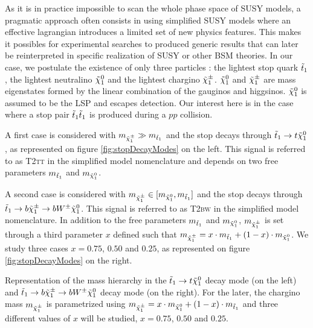         As it is in practice impossible to scan the whole phase space of SUSY models, a
        pragmatic approach often consists in using simplified SUSY models where an
        effective lagrangian introduces a limited set of new physics features. This makes
        it possibles for experimental searches to produced generic results that can later
        be reinterpreted in specific realization of SUSY \cite{LiemSMS, SmodelS}
        or other BSM theories. In our case, we postulate the existence of only three
        particles : the lightest stop quark $\tilde{t}_1$, the lightest neutralino $\tilde{\chi}_1^0$
        and the lightest chargino $\tilde{\chi}_1^\pm$. $\tilde{\chi}_1^0$ and $\tilde{\chi}_1^\pm$ are mass
        eigenstates formed by the linear combination of the gauginos and  higgsinos.
        $\tilde{\chi}_1^0$ is assumed to be the LSP and escapes detection. Our interest here
        is in the case where a stop pair $\tilde{t}_1\tilde{t}_1$ is produced during a $pp$ collision.

        A first case is considered with $m_{\tilde{\chi}_1^\pm} \gg m_{\tilde{t}_1}$ and the stop
        decays through $\tilde{t}_1 \rightarrow t \tilde{\chi}_1^0$, as represented on figure
        \ref{fig:stopDecayModes} on the left. This signal is referred to as \textsc{T2tt}
        in the simplified model nomenclature and depends on two free parameters
        $m_{\tilde{t}_1}$ and $m_{\tilde{\chi}_1^0}$.

        A second case is considered with $m_{\tilde{\chi}_1^\pm} \in [m_{\tilde{\chi}_1^0},
        m_{\tilde{t}_1}]$ and the stop decays through $\tilde{t}_1 \rightarrow b \tilde{\chi}_1^\pm
        \rightarrow b W^{\pm} \tilde{\chi}_1^0$. This signal is referred to as \textsc{T2bw}
        in the simplified model nomenclature. In addition to the free  parameters
        $m_{\tilde{t}_1}$ and $m_{\tilde{\chi}_1^0}$, $m_{\tilde{\chi}_1^\pm}$ is set through a
        third parameter $x$ defined such that $m_{\tilde{\chi}_1^\pm} = x \cdot m_{\tilde{t}_1}
        + (1 - x) \cdot m_{\tilde{\chi}_1^0}$. We study three cases $x = 0.75$, $0.50$
        and $0.25$, as represented on figure \ref{fig:stopDecayModes} on the right.

                     {Representation of the mass hierarchy in the $\tilde{t}_1 \rightarrow t
                     \tilde{\chi}_1^0$ decay mode (on the left) and $\tilde{t}_1 \rightarrow b
                     \tilde{\chi}_1^\pm \rightarrow b W^{\pm} \tilde{\chi}_1^0 $ decay mode (on the
                     right). For the later, the chargino mass $m_{\tilde{\chi}_1^\pm}$ is
                     parametrized using $m_{\tilde{\chi}_1^\pm} = x \cdot m_{\tilde{\chi}_1^0}
                     + (1 - x) \cdot m_{\tilde{t}_1}$ and three different values of $x$ will
                     be studied, $x = 0.75$, $0.50$ and $0.25$.}

